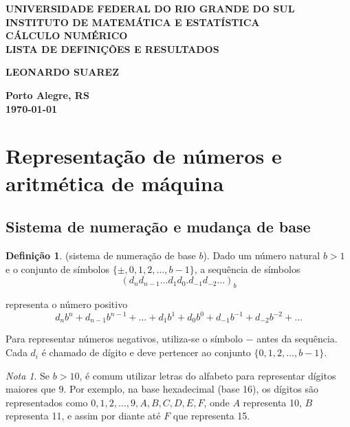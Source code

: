 \documentclass{article}
\theoremstyle{plain}
\theoremstyle{definition}
\newtheorem{defn}{Definição}[section]
\theoremstyle{remark}
\newtheorem*{rem}{Nota}
\begin{document}
\begin{center}
    \textbf{\large UNIVERSIDADE FEDERAL DO RIO GRANDE DO SUL} \\
    \textbf{\large INSTITUTO DE MATEMÁTICA E ESTATÍSTICA} \\
    \vspace{3cm}
    \textbf{\Large CÁLCULO NUMÉRICO} \\
    \vspace{1cm}
    \textbf{\large LISTA DE DEFINIÇÕES E RESULTADOS} \\
    \vspace{3cm}

    \textbf{LEONARDO SUAREZ}

    \vfill
    \textbf{\large Porto Alegre, RS} \\
    \textbf{\large \today}
\end{center}

\newpage
\tableofcontents
\newpage

\section{Representação de números e aritmética de máquina}

\subsection{Sistema de numeração e mudança de base}

\begin{defn} (sistema de numeração de base \(b\)). 
    Dado um número natural \(b > 1\) e o conjunto de símbolos \(\{\pm, 0, 1, 2, \ldots, b-1\}\), a sequência de símbolos
    \begin{equation}
        (d_n d_{n-1} \ldots d_1 d_0 . d_{-1} d_{-2} \ldots)_b
    \end{equation}

    representa o número positivo
    \begin{equation}
        d_n b^n + d_{n-1} b^{n-1} + \ldots + d_1 b^1 + d_0 b^0 + d_{-1} b^{-1} + d_{-2} b^{-2} + \ldots
    \end{equation}

    Para representar números negativos, utiliza-se o símbolo \(-\) antes da sequência. Cada \(d_i\) é chamado de dígito e deve pertencer ao conjunto \(\{0, 1, 2, \ldots, b-1\}\).
\end{defn}

\begin{rem}
    Se \(b > 10\), é comum utilizar letras do alfabeto para representar dígitos maiores que 9. Por exemplo, na base hexadecimal (base 16), os dígitos são representados como \(0, 1, 2, \ldots, 9, A, B, C, D, E, F\), onde \(A\) representa 10, \(B\) representa 11, e assim por diante até \(F\) que representa 15.
\end{rem}
\end{document}
